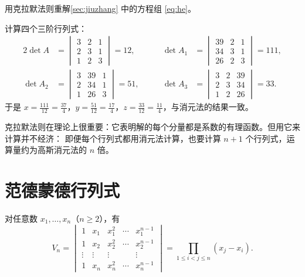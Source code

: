 \begin{example}\label{ex:he-cramer}
用克拉默法则重解\cref{sec:jiuzhang} 中的方程组 \cref{eq:he}。
\end{example}

\begin{solution}
计算四个三阶行列式：
\begin{alignat*}{2}
\det A&=\begin{vmatrix}3&2&1\\2&3&1\\1&2&3\end{vmatrix}=12, &\qquad
\det A_1&=\begin{vmatrix}39&2&1\\34&3&1\\26&2&3\end{vmatrix}=111,\\
\det A_2&=\begin{vmatrix}3&39&1\\2&34&1\\1&26&3\end{vmatrix}=51, &\qquad
\det A_3&=\begin{vmatrix}3&2&39\\2&3&34\\1&2&26\end{vmatrix}=33 .
\end{alignat*}
于是 $x=\frac{111}{12}=\frac{37}{4}$，$y=\frac{51}{12}=\frac{17}{4}$，$z=\frac{33}{12}=\frac{11}{4}$，与消元法的结果一致。
\end{solution}

\begin{remark}
克拉默法则在理论上很重要：它表明解的每个分量都是系数的有理函数。但用它来计算并不经济：
即便每个行列式都用消元法计算，也要计算 $n+1$ 个行列式，运算量约为高斯消元法的 $n$ 倍。
\end{remark}

\section{范德蒙德行列式}\label{sec:vandermonde}

\begin{theorem}\label{thm:vandermonde}
对任意数 $x_1,\dotsc,x_n$（$n\ge2$），有
\begin{equation}\label{eq:vandermonde}
  V_n=\begin{vmatrix}
  1&x_1&x_1^2&\cdots&x_1^{n-1}\\
  1&x_2&x_2^2&\cdots&x_2^{n-1}\\
  \vdots&\vdots&\vdots&&\vdots\\
  1&x_n&x_n^2&\cdots&x_n^{n-1}
  \end{vmatrix}
  =\prod_{1\le i<j\le n}(x_j-x_i).
\end{equation}
\end{theorem}

